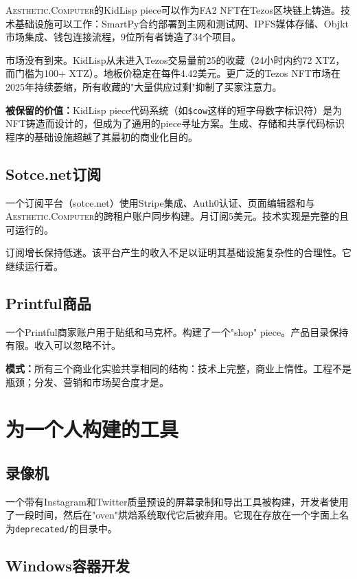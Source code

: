 \documentclass[10pt,letterpaper,twocolumn]{article}
\newcommand{\ac}{\textsc{Aesthetic.Computer}}
\begin{document}
\ac{}的KidLisp piece可以作为FA2 NFT在Tezos区块链上铸造。技术基础设施可以工作：SmartPy合约部署到主网和测试网、IPFS媒体存储、Objkt市场集成、钱包连接流程，9位所有者铸造了34个项目。

市场没有到来。KidLisp从未进入Tezos交易量前25的收藏（24小时内约72 XTZ，而门槛为100+ XTZ）。地板价稳定在每件4.42美元。更广泛的Tezos NFT市场在2025年持续萎缩，所有收藏的"大量供应过剩"抑制了买家注意力。

\textbf{被保留的价值：}KidLisp piece代码系统（如\texttt{\$cow}这样的短字母数字标识符）是为NFT铸造而设计的，但成为了通用的piece寻址方案。生成、存储和共享代码标识程序的基础设施超越了其最初的商业化目的。

\subsection{Sotce.net订阅}

一个订阅平台（sotce.net）使用Stripe集成、Auth0认证、页面编辑器和与\ac{}的跨租户账户同步构建。月订阅5美元。技术实现是完整的且可运行的。

订阅增长保持低迷。该平台产生的收入不足以证明其基础设施复杂性的合理性。它继续运行着。

\subsection{Printful商品}

一个Printful商家账户用于贴纸和马克杯。构建了一个"shop" piece。产品目录保持有限。收入可以忽略不计。

\textbf{模式：}所有三个商业化实验共享相同的结构：技术上完整，商业上惰性。工程不是瓶颈；分发、营销和市场契合度才是。

\section{为一个人构建的工具}

\subsection{录像机}

一个带有Instagram和Twitter质量预设的屏幕录制和导出工具被构建，开发者使用了一段时间，然后在"oven"烘焙系统取代它后被弃用。它现在存放在一个字面上名为\texttt{deprecated/}的目录中。

\subsection{Windows容器开发}
\end{document}

